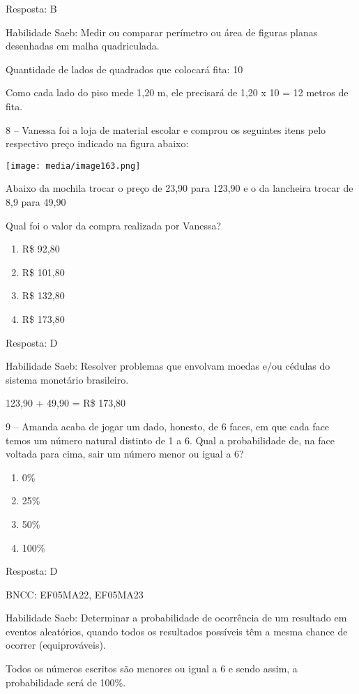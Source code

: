 Resposta: B

Habilidade Saeb: Medir ou comparar perímetro ou área de figuras planas
desenhadas em malha quadriculada.

Quantidade de lados de quadrados que colocará fita: 10

Como cada lado do piso mede 1,20 m, ele precisará de 1,20 x 10 = 12
metros de fita.

8 -- Vanessa foi a loja de material escolar e comprou os seguintes itens
pelo respectivo preço indicado na figura abaixo:

\texttt{[image: media/image163.png]}

Abaixo da mochila trocar o preço de 23,90 para 123,90 e o da lancheira
trocar de 8,9 para 49,90

Qual foi o valor da compra realizada por Vanessa?

\begin{enumerate}
\def\labelenumi{\alph{enumi})}
\item
  R\$ 92,80
\item
  R\$ 101,80
\item
  R\$ 132,80
\item
  R\$ 173,80
\end{enumerate}

Resposta: D

Habilidade Saeb: Resolver problemas que envolvam moedas e/ou cédulas do
sistema monetário brasileiro.

123,90 + 49,90 = R\$ 173,80

9 -- Amanda acaba de jogar um dado, honesto, de 6 faces, em que cada
face temos um número natural distinto de 1 a 6. Qual a probabilidade de,
na face voltada para cima, sair um número menor ou igual a 6?

\begin{enumerate}
\def\labelenumi{\alph{enumi})}
\item
  0\%
\item
  25\%
\item
  50\%
\item
  100\%
\end{enumerate}

Resposta: D

BNCC: EF05MA22, EF05MA23

Habilidade Saeb: Determinar a probabilidade de ocorrência de um
resultado em eventos aleatórios, quando todos os resultados possíveis
têm a mesma chance de ocorrer (equiprováveis).

Todos os números escritos são menores ou igual a 6 e sendo assim, a
probabilidade será de 100\%.

